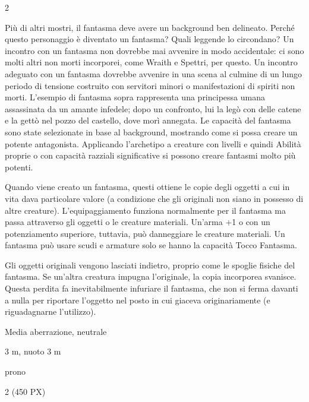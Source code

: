 \begin{multicols}{2}
{Più di altri mostri, il fantasma deve avere un background ben delineato. Perché questo personaggio è diventato un fantasma? Quali leggende lo circondano? Un incontro con un fantasma non dovrebbe mai avvenire in modo accidentale: ci sono molti altri non morti incorporei, come Wraith e Spettri, per questo. Un incontro adeguato con un fantasma dovrebbe avvenire in una scena al culmine di un lungo periodo di tensione costruito con servitori minori o manifestazioni di spiriti non morti. L'esempio di fantasma sopra rappresenta una principessa umana assassinata da un amante infedele; dopo un confronto, lui la legò con delle catene e la gettò nel pozzo del castello, dove morì annegata. Le capacità del fantasma sono state selezionate in base al background, mostrando come si possa creare un potente antagonista. Applicando l'archetipo a creature con livelli e quindi Abilità proprie o con capacità razziali significative si possono creare fantasmi molto più potenti.

Quando viene creato un fantasma, questi ottiene le copie degli oggetti a cui in vita dava particolare valore (a condizione che gli originali non siano in possesso di altre creature). L'equipaggiamento funziona normalmente per il fantasma ma passa attraverso gli oggetti o le creature materiali. Un'arma +1 o con un potenziamento superiore, tuttavia, può danneggiare le creature materiali. Un fantasma può usare scudi e armature solo se hanno la capacità Tocco Fantasma.

Gli oggetti originali vengono lasciati indietro, proprio come le spoglie fisiche del fantasma. Se un'altra creatura impugna l'originale, la copia incorporea svanisce. Questa perdita fa inevitabilmente infuriare il fantasma, che non si ferma davanti a nulla per riportare l'oggetto nel posto in cui giaceva originariamente (e riguadagnarne l'utilizzo).

\begin{description}[noitemsep, topsep=0pt, parsep=0pt, partopsep=0pt, itemsep=1pt, leftmargin=2.35cm,  labelwidth=2.2cm, itemindent=0cm, listparindent=0pt] %
\setlength{\baselineskip}{10pt}
\item[\textbf{Taglia/Tipo}] Media aberrazione, neutrale
\item[\textbf{Caratt.}] 
\item[\textbf{Punti Ferita}] 
\item[\textbf{Movimento}] 3 m, nuoto 3 m
\item[\textbf{Tiri Salvez.}] 
\item[\textbf{Immunità}] prono
\item[\textbf{Sensi}] 
\item[\textbf{Sfida}] 2 (450 PX)
\end{description}
\smallskip

}
\end{multicols}
